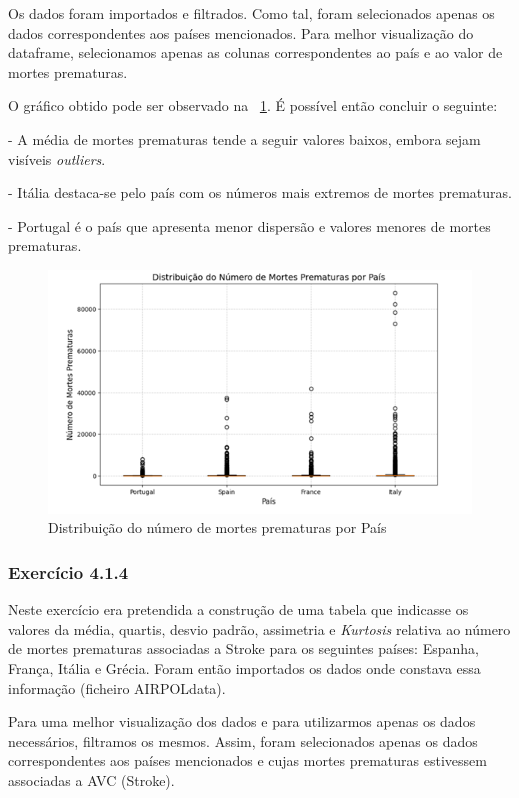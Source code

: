 \documentclass[conference]{IEEEtran}
\begin{document}
Os dados foram importados e filtrados. Como tal, foram selecionados apenas os dados correspondentes aos países mencionados. Para melhor visualização do dataframe, selecionamos apenas as colunas correspondentes ao país e ao valor de mortes prematuras. 

O gráfico obtido pode ser observado na \figurename~\ref{fig:mortesprematuras}. É possível então concluir o seguinte:

- A média de mortes prematuras tende a seguir valores baixos, embora sejam visíveis \textit{outliers}.

- Itália destaca-se pelo país com os números mais extremos de mortes prematuras.

- Portugal é o país que apresenta menor dispersão e valores menores de mortes prematuras.


\begin{figure}
	\centering
	\includegraphics[width=0.9\linewidth]{mortes_prematuras}
	\caption{Distribuição do número de mortes prematuras por País}
	\label{fig:mortesprematuras}
\end{figure}


\medskip
\subsubsection{\textbf{Exercício 4.1.4}}

Neste exercício era pretendida a construção de uma tabela que indicasse os valores da média, quartis, desvio padrão, assimetria e \textit{Kurtosis} relativa ao número de mortes prematuras associadas a Stroke para os seguintes países: Espanha, França, Itália e Grécia. Foram então importados os dados onde constava essa informação (ficheiro AIRPOLdata). 
 
Para uma melhor visualização dos dados e para utilizarmos apenas os dados necessários, filtramos os mesmos. Assim, foram selecionados apenas os dados correspondentes aos países mencionados e cujas mortes prematuras estivessem associadas a AVC (Stroke). 
\end{document}
